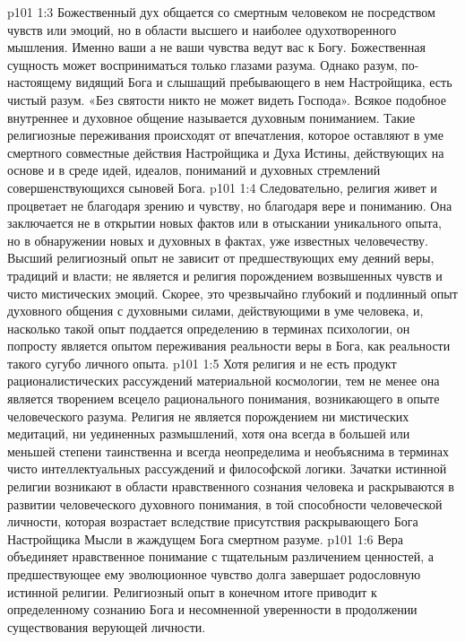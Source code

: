 \vs p101 1:3 Божественный дух общается со смертным человеком не посредством чувств или эмоций, но в области высшего и наиболее одухотворенного мышления. Именно ваши  а не ваши чувства ведут вас к Богу. Божественная сущность может восприниматься только глазами разума. Однако разум, по\hyp{}настоящему видящий Бога и слышащий пребывающего в нем Настройщика, есть чистый разум. «Без святости никто не может видеть Господа». Всякое подобное внутреннее и духовное общение называется духовным пониманием. Такие религиозные переживания происходят от впечатления, которое оставляют в уме смертного совместные действия Настройщика и Духа Истины, действующих на основе и в среде идей, идеалов, пониманий и духовных стремлений совершенствующихся сыновей Бога.
\vs p101 1:4 Следовательно, религия живет и процветает не благодаря зрению и чувству, но благодаря вере и пониманию. Она заключается не в открытии новых фактов или в отыскании уникального опыта, но в обнаружении новых и духовных  в фактах, уже известных человечеству. Высший религиозный опыт не зависит от предшествующих ему деяний веры, традиций и власти; не является и религия порождением возвышенных чувств и чисто мистических эмоций. Скорее, это чрезвычайно глубокий и подлинный опыт духовного общения с духовными силами, действующими в уме человека, и, насколько такой опыт поддается определению в терминах психологии, он попросту является опытом переживания реальности веры в Бога, как реальности такого сугубо личного опыта.
\vs p101 1:5 \pc Хотя религия и не есть продукт рационалистических рассуждений материальной космологии, тем не менее она является творением всецело рационального понимания, возникающего в опыте человеческого разума. Религия не является порождением ни мистических медитаций, ни уединенных размышлений, хотя она всегда в большей или меньшей степени таинственна и всегда неопределима и необъяснима в терминах чисто интеллектуальных рассуждений и философской логики. Зачатки истинной религии возникают в области нравственного сознания человека и раскрываются в развитии человеческого духовного понимания, в той способности человеческой личности, которая возрастает вследствие присутствия раскрывающего Бога Настройщика Мысли в жаждущем Бога смертном разуме.
\vs p101 1:6 Вера объединяет нравственное понимание с тщательным различением ценностей, а предшествующее ему эволюционное чувство долга завершает родословную истинной религии. Религиозный опыт в конечном итоге приводит к определенному сознанию Бога и несомненной уверенности в продолжении существования верующей личности.

